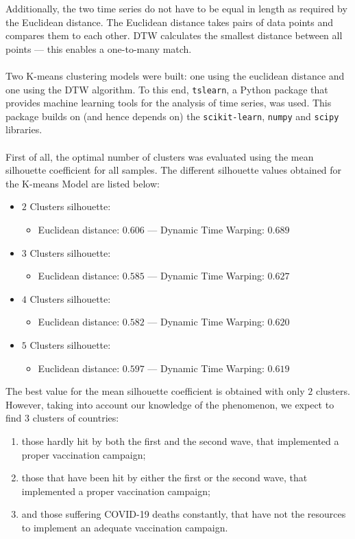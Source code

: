 \documentclass[11pt,a4paper]{article}
\begin{document}
\noindent
Additionally, the two time series do not have to be equal in length as required
by the Euclidean distance. The Euclidean distance takes pairs of data points and
compares them to each other. DTW calculates the smallest distance between all
points --- this enables a one-to-many match.\\
\\
Two K-means clustering models were built: one using the euclidean distance and
one using the DTW algorithm. To this end, \texttt{tslearn}, a Python package
that provides machine learning tools for the analysis of time series, was used.
This package builds on (and hence depends on) the \texttt{scikit-learn},
\texttt{numpy} and \texttt{scipy} libraries.\\
\\
First of all, the optimal number of clusters was evaluated using the mean
silhouette coefficient for all samples. The different silhouette values obtained
for the K-means Model are listed below:
\begin{itemize}
    \item $2$ Clusters silhouette:
    \begin{itemize}
        \item Euclidean distance: $0.606$ --- Dynamic Time Warping: $0.689$
    \end{itemize}
    \item $3$ Clusters silhouette:
    \begin{itemize}
        \item Euclidean distance: $0.585$ --- Dynamic Time Warping: $0.627$
    \end{itemize}
    \item $4$ Clusters silhouette:
    \begin{itemize}
        \item Euclidean distance: $0.582$ --- Dynamic Time Warping: $0.620$
    \end{itemize}
    \item $5$ Clusters silhouette:
    \begin{itemize}
        \item Euclidean distance: $0.597$ --- Dynamic Time Warping: $0.619$
    \end{itemize}
\end{itemize}
The best value for the mean silhouette coefficient is obtained with only $2$
clusters. However, taking into account our knowledge of the phenomenon, we
expect to find $3$ clusters of countries:
\begin{enumerate}
    \item those hardly hit by both the first and the second wave, that
    implemented a proper vaccination campaign;
    \item those that have been hit by either the first or the second wave, that
    implemented a proper vaccination campaign;
    \item and those suffering COVID-19 deaths constantly, that have not the
    resources to implement an adequate vaccination campaign.
\end{enumerate}
\end{document}
